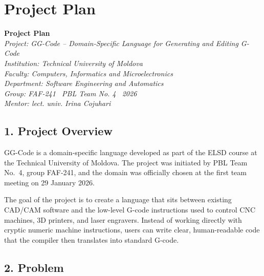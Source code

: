 \chapter{Project Plan}

\begin{center}
    {\Large\textbf{Project Plan}}\\[0.4em]
    \textit{Project: GG-Code -- Domain-Specific Language for Generating and Editing G-Code}\\[0.2em]
    \textit{Institution: Technical University of Moldova}\\[0.2em]
    \textit{Faculty: Computers, Informatics and Microelectronics}\\[0.2em]
    \textit{Department: Software Engineering and Automatics}\\[0.2em]
    \textit{Group: FAF-241 \textbar\ PBL Team No. 4 \textbar\ 2026}\\[0.2em]
    \textit{Mentor: lect. univ. Irina Cojuhari}
\end{center}

\vspace{1em}

\section*{1. Project Overview}

GG-Code is a domain-specific language developed as part of the ELSD course at the Technical
University of Moldova. The project was initiated by PBL Team No.~4, group FAF-241, and the
domain was officially chosen at the first team meeting on 29 January 2026.

The goal of the project is to create a language that sits between existing CAD/CAM software
and the low-level G-code instructions used to control CNC machines, 3D printers, and laser
engravers. Instead of working directly with cryptic numeric machine instructions, users can
write clear, human-readable code that the compiler then translates into standard G-code.

\section*{2. Problem}

